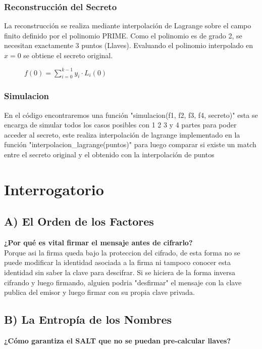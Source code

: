 \documentclass{article}
\begin{document}
\subsubsection{Reconstrucción del Secreto}

La reconstrucción se realiza mediante interpolación de Lagrange sobre el campo finito definido por el polinomio PRIME. Como el polinomio 
es de grado 2, se necesitan exactamente 3 puntos (Llaves). Evaluando el polinomio interpolado en $x = 0$ se obtiene el secreto original.

\begin{figure}[ht]
    \centering
    $f(0) = \sum_{i=0}^{k-1} y_i \cdot L_i(0)$
\end{figure}


\subsubsection{Simulacion}

En el código encontraremos una función "simulacion(f1, f2, f3, f4, secreto)" esta se encarga de simular todos los casos posibles con 1 2 3 y 4 
partes para poder acceder al secreto, este realiza interpolación de lagrange implementado en la función "interpolacion\_lagrange(puntos)" 
para luego comparar si existe un match entre el secreto original y el obtenido con la interpolación de puntos


\section{Interrogatorio}

\subsection{A) El Orden de los Factores}
\textbf{¿Por qué es vital firmar el mensaje antes de cifrarlo?} \\

Porque asi la firma queda bajo la proteccion del cifrado, de esta forma no se puede modificar la identidad asociada a la firma ni tampoco
conocer esta identidad sin saber la clave para descifrar. Si se hiciera de la forma inversa cifrando y luego firmando, alguien podria "desfirmar"
el mensaje con la clave publica del emisor y luego firmar con su propia clave privada.

\subsection{B) La Entropía de los Nombres}
\textbf{¿Cómo garantiza el SALT que no se puedan pre-calcular llaves?} \\
\end{document}
